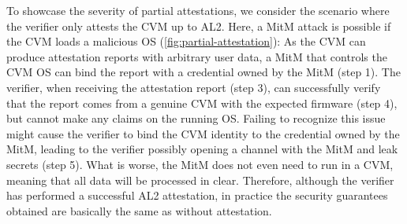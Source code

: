 To showcase the severity of partial attestations, we consider the scenario where
the verifier only attests the \ac{CVM} up to AL2. Here, a \ac{MitM}
attack is possible if the \ac{CVM} loads a malicious OS
(\cref{fig:partial-attestation}): As the \ac{CVM} can produce attestation
reports with arbitrary user data, a \ac{MitM} that controls the \ac{CVM} OS can
bind the report with a credential owned by the \ac{MitM} (step 1). The verifier,
when receiving the attestation report (step 3), can successfully verify that the
report comes from a genuine \ac{CVM} with the expected firmware (step 4), but
cannot make any claims on the running OS. Failing to recognize this issue might
cause the verifier to bind the \ac{CVM} identity to the credential owned by the
\ac{MitM}, leading to the verifier possibly opening a channel with the \ac{MitM}
and leak secrets (step 5). What is worse, the \ac{MitM} does not even need to
run in a \ac{CVM}, meaning that all data will be processed in clear. Therefore,
although the verifier has performed a successful AL2 attestation, in
practice the security guarantees obtained are basically the same as without
attestation.
